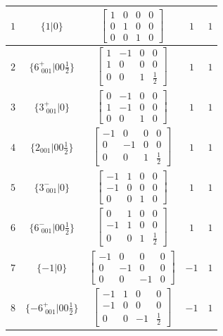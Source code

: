 \documentclass[fleqn,8pt]{jsarticle}
\begin{document}
\begin{longtable}{ccccc}
$ 1 $ & $ \{1|0\} $ & $ \begin{bmatrix} 1 & 0 & 0 & 0 \\ 0 & 1 & 0 & 0 \\ 0 & 0 & 1 & 0 \end{bmatrix} $ & $ 1 $ & $ 1 $ \\ \hline
$ 2 $ & $ \{6^{+}_{\,\,001}|0 0 \frac{1}{2}\} $ & $ \begin{bmatrix} 1 & -1 & 0 & 0 \\ 1 & 0 & 0 & 0 \\ 0 & 0 & 1 & \frac{1}{2} \end{bmatrix} $ & $ 1 $ & $ 1 $ \\ \hline
$ 3 $ & $ \{3^{+}_{\,\,001}|0\} $ & $ \begin{bmatrix} 0 & -1 & 0 & 0 \\ 1 & -1 & 0 & 0 \\ 0 & 0 & 1 & 0 \end{bmatrix} $ & $ 1 $ & $ 1 $ \\ \hline
$ 4 $ & $ \{2{}_{001}|0 0 \frac{1}{2}\} $ & $ \begin{bmatrix} -1 & 0 & 0 & 0 \\ 0 & -1 & 0 & 0 \\ 0 & 0 & 1 & \frac{1}{2} \end{bmatrix} $ & $ 1 $ & $ 1 $ \\ \hline
$ 5 $ & $ \{3^{-}_{\,\,001}|0\} $ & $ \begin{bmatrix} -1 & 1 & 0 & 0 \\ -1 & 0 & 0 & 0 \\ 0 & 0 & 1 & 0 \end{bmatrix} $ & $ 1 $ & $ 1 $ \\ \hline
$ 6 $ & $ \{6^{-}_{\,\,001}|0 0 \frac{1}{2}\} $ & $ \begin{bmatrix} 0 & 1 & 0 & 0 \\ -1 & 1 & 0 & 0 \\ 0 & 0 & 1 & \frac{1}{2} \end{bmatrix} $ & $ 1 $ & $ 1 $ \\ \hline
$ 7 $ & $ \{-1|0\} $ & $ \begin{bmatrix} -1 & 0 & 0 & 0 \\ 0 & -1 & 0 & 0 \\ 0 & 0 & -1 & 0 \end{bmatrix} $ & $ -1 $ & $ 1 $ \\ \hline
$ 8 $ & $ \{-6^{+}_{\,\,001}|0 0 \frac{1}{2}\} $ & $ \begin{bmatrix} -1 & 1 & 0 & 0 \\ -1 & 0 & 0 & 0 \\ 0 & 0 & -1 & \frac{1}{2} \end{bmatrix} $ & $ -1 $ & $ 1 $ \\ \hline

\end{longtable}
\end{document}

